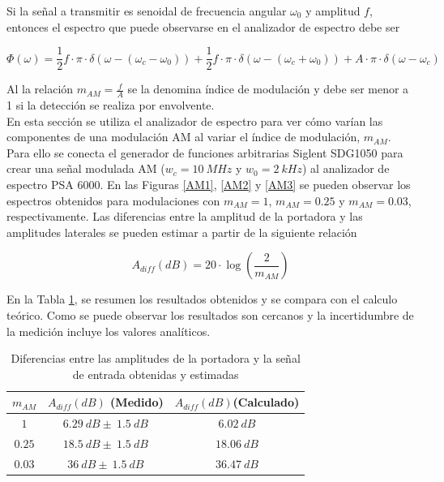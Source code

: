 \documentclass[a4paper,10pt]{article}
\begin{document}
		\indent Si la se\~nal a transmitir es senoidal de frecuencia angular 
		$\omega_0$ y amplitud $f$, entonces el espectro que puede observarse en 
		el analizador de espectro debe ser 
		
		$$\Phi(\omega)=\frac{1}{2}f\cdot\pi\cdot\delta(\omega-(\omega_c-\omega_0
		))+\frac{1}{2}f\cdot\pi\cdot\delta(\omega-(\omega_c+\omega_0))+A\cdot\pi
		\cdot\delta(\omega-\omega_c)$$
		
		\indent Al la relaci\'on $m_{AM}=\frac{f}{A}$ se la denomina \'indice de
		modulaci\'on y debe ser menor a 1 si la detecci\'on se realiza por 
		envolvente. \\
		\indent En esta secci\'on se utiliza el analizador de espectro para ver 
		c\'omo var\'ian las componentes de una modulaci\'on AM al variar el 
		\'indice de modulaci\'on, $m_{AM}$. Para ello se conecta el generador de
		funciones arbitrarias Siglent SDG1050 para crear una se\~nal modulada AM
		($w_c=10~MHz$ y $w_0=2~kHz$) al analizador de espectro PSA 6000. En las
		Figuras \ref{AM1}, \ref{AM2} y \ref{AM3} se pueden observar los 
		espectros obtenidos para modulaciones con $m_{AM}=1$, $m_{AM}=0.25$ y 
		$m_{AM}=0.03$, respectivamente. Las diferencias entre la amplitud de la 
		portadora y las amplitudes laterales se pueden estimar a partir de la 
		siguiente relaci\'on

		$$A_{diff}(dB)=20\cdot\log(\frac{2}{m_{AM}})$$
		
		\indent En la Tabla \ref{AM}, se resumen los resultados obtenidos y se 
		compara con el calculo te\'orico. Como se puede observar los resultados 
		son cercanos y la incertidumbre de la medici\'on incluye los valores 
		anal\'iticos.
		
		\begin{table}[!htp]
			\centering
			\begin{tabular}{|c|c|c|}
				\hline
				$m_{AM}$ & $A_{diff}(dB)$ (Medido) & $A_{diff}(dB)$(Calculado)\\
				\hline
				$1$ & $6.29~dB\pm~1.5~dB$& $6.02~dB$ \\
				\hline
				$0.25$ & $18.5~dB\pm~1.5~dB$& $18.06~dB$ \\
				\hline
				$0.03$ & $36~dB\pm~1.5~dB$& $36.47~dB$
			\end{tabular}
			\caption{Diferencias entre las amplitudes de la portadora y la 
			se\~nal de entrada obtenidas y estimadas} \label{AM}
		\end{table}	
		
\end{document}
